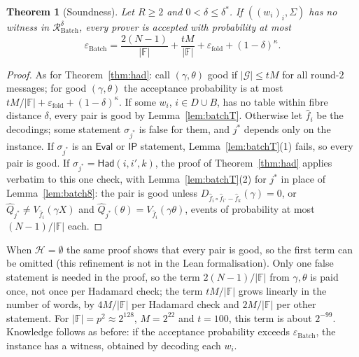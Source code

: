 \documentclass[11pt]{article}
\newtheorem{theorem}{Theorem}
\theoremstyle{definition}
\newcommand{\F}{\mathbb{F}}
\begin{document}
\begin{theorem}[Soundness]\label{thm:batch}
Let $R\ge2$ and $0<\delta\le\delta^\ast$. If $((w_i)_i,\Sigma)$ has no witness in $\mathcal R^\delta_{\mathrm{Batch}}$, every prover is accepted with probability at most
\[
\varepsilon_{\mathrm{Batch}}=\frac{2(N-1)}{|\F|}+\frac{tM}{|\F|}+\varepsilon_{\mathrm{fold}}+(1-\delta)^\kappa.
\]
\end{theorem}
\begin{proof}
As for Theorem~\ref{thm:had}: call $(\gamma,\theta)$ good if $|\mathcal G|\le tM$ for all round-$2$ messages; for good $(\gamma,\theta)$ the acceptance probability is at most $tM/|\F|+\varepsilon_{\mathrm{fold}}+(1-\delta)^\kappa$.
If some $w_i$, $i\in D\cup B$, has no table within fibre distance $\delta$, every pair is good by Lemma~\ref{lem:batchT}.
Otherwise let $\hat f_i$ be the decodings; some statement $\sigma_{j^\ast}$ is false for them, and $j^\ast$ depends only on the instance.
If $\sigma_{j^\ast}$ is an $\mathsf{Eval}$ or $\mathsf{IP}$ statement, Lemma~\ref{lem:batchT}(1) fails, so every pair is good.
If $\sigma_{j^\ast}=\mathsf{Had}(i,i',k)$, the proof of Theorem~\ref{thm:had} applies verbatim to this one check, with Lemma~\ref{lem:batchT}(2) for $j^\ast$ in place of Lemma~\ref{lem:batch8}: the pair is good unless $D_{\hat f_i\circ\hat f_{i'}-\hat f_k}(\gamma)=0$, or $\hat Q_{j^\ast}\ne V_{\hat f_i}(\gamma X)$ and $\hat Q_{j^\ast}(\theta)=V_{\hat f_i}(\gamma\theta)$, events of probability at most $(N-1)/|\F|$ each.
\end{proof}

When $\mathcal H=\emptyset$ the same proof shows that every pair is good, so the first term can be omitted (this refinement is not in the Lean formalisation).
Only one false statement is needed in the proof, so the term $2(N-1)/|\F|$ from $\gamma,\theta$ is paid once, not once per Hadamard check; the term $tM/|\F|$ grows linearly in the number of words, by $4M/|\F|$ per Hadamard check and $2M/|\F|$ per other statement. For $|\F|=p^2\approx2^{128}$, $M=2^{22}$ and $t=100$, this term is about $2^{-99}$.
Knowledge follows as before: if the acceptance probability exceeds $\varepsilon_{\mathrm{Batch}}$, the instance has a witness, obtained by decoding each $w_i$.
\end{document}
